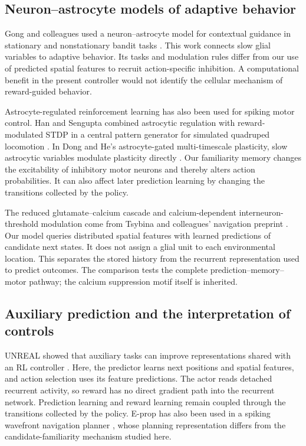 \subsection{Neuron--astrocyte models of adaptive behavior}
Gong and colleagues used a neuron--astrocyte model for contextual guidance in stationary and nonstationary bandit tasks \cite{gong2024astrocytes}. This work connects slow glial variables to adaptive behavior. Its tasks and modulation rules differ from our use of predicted spatial features to recruit action-specific inhibition. A computational benefit in the present controller would not identify the cellular mechanism of reward-guided behavior.

Astrocyte-regulated reinforcement learning has also been used for spiking motor control. Han and Sengupta combined astrocytic regulation with reward-modulated STDP in a central pattern generator for simulated quadruped locomotion \cite{han2026astrocyte}. In Dong and He's astrocyte-gated multi-timescale plasticity, slow astrocytic variables modulate plasticity directly \cite{dong2026agmp}. Our familiarity memory changes the excitability of inhibitory motor neurons and thereby alters action probabilities. It can also affect later prediction learning by changing the transitions collected by the policy.

The reduced glutamate--calcium cascade and calcium-dependent interneuron-threshold modulation come from Tsybina and colleagues' navigation preprint \cite{tsybina2026}. Our model queries distributed spatial features with learned predictions of candidate next states. It does not assign a glial unit to each environmental location. This separates the stored history from the recurrent representation used to predict outcomes. The comparison tests the complete prediction--memory--motor pathway; the calcium suppression motif itself is inherited.

\subsection{Auxiliary prediction and the interpretation of controls}
UNREAL showed that auxiliary tasks can improve representations shared with an RL controller \cite{jaderberg2017reinforcement}. Here, the predictor learns next positions and spatial features, and action selection uses its feature predictions. The actor reads detached recurrent activity, so reward has no direct gradient path into the recurrent network. Prediction learning and reward learning remain coupled through the transitions collected by the policy. E-prop has also been used in a spiking wavefront navigation planner \cite{espino2024rapid}, whose planning representation differs from the candidate-familiarity mechanism studied here.

